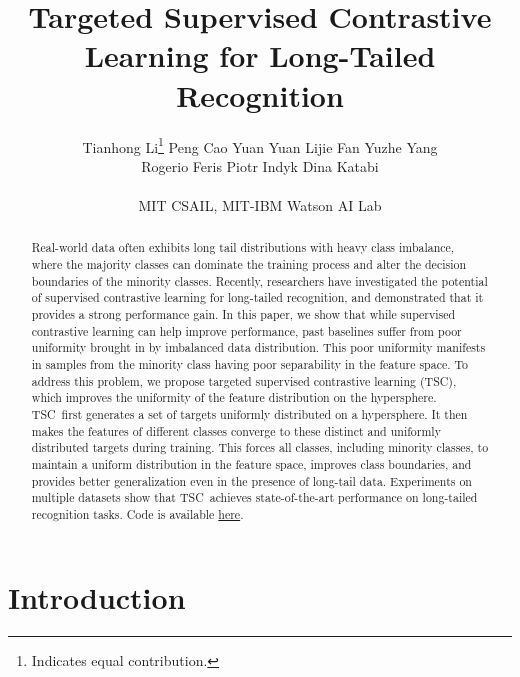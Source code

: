 \documentclass[10pt,twocolumn,letterpaper]{article}
\newcommand{\name} {TSC}
\begin{document}
\title{Targeted Supervised Contrastive Learning for Long-Tailed Recognition}


\author{Tianhong Li\thanks{Indicates equal contribution.} \quad Peng Cao \quad Yuan Yuan \quad Lijie Fan \quad Yuzhe Yang \\ 
\quad Rogerio Feris \quad Piotr Indyk \quad Dina Katabi \\\\ MIT CSAIL, MIT-IBM Watson AI Lab}
\maketitle

\begin{abstract}


Real-world data often exhibits long tail distributions with heavy class imbalance, where the majority classes can dominate the training process and alter the decision boundaries of the minority classes. Recently, researchers have investigated the potential of supervised contrastive learning for long-tailed recognition, and demonstrated that it provides a strong performance gain. In this paper, we show that while supervised contrastive learning can help improve performance, past baselines suffer from poor uniformity brought in by imbalanced data distribution. This poor uniformity manifests in samples from the minority class having poor separability in the feature space. To address this problem, we propose targeted supervised contrastive learning (\name), which improves the uniformity of the feature distribution on the hypersphere. \name\ first generates a set of targets uniformly distributed on a hypersphere. It then makes the features of different classes converge to these distinct and uniformly distributed targets during training.  This forces all classes, including minority classes, to maintain a uniform distribution in the feature space, improves class boundaries, and provides better generalization even in the presence of long-tail data. Experiments on multiple datasets show that \name~achieves state-of-the-art performance on long-tailed recognition tasks. Code is available \href{https://github.com/LTH14/targeted-supcon}{here}. \end{abstract}
 
\section{Introduction}\label{sec:intro}
\end{document}
